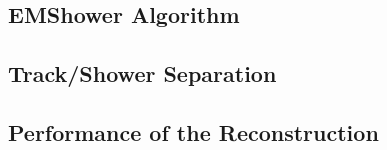 \subsection{EMShower Algorithm}\label{sec:EMShower}

\subsection{Track/Shower Separation}\label{sec:TrackShowerSeparation}

\subsection{Performance of the Reconstruction}\label{sec:ReconstructionPerformance}
